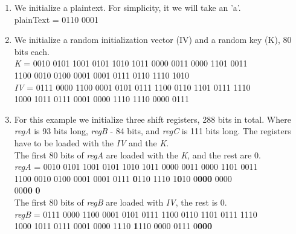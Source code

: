 \begin{enumerate}
	\setlength\itemsep{0.8em}
	\item We initialize a plaintext. For simplicity, it we will take an 'a'.\\
	{\selectfont
		plainText = 0110 0001
	}
	
	
	\item We initialize a random initialization vector (IV) and a random key (K), 80 bits each.\\
	{\selectfont
		\emph{K} = 0010 0101 1001 0101 1010 1011 0000 0011 0000 1101 0011\\
		\indent\hspace{1cm}1100 0010 0100 0001 0001 0111 0110 1110 1010
	}
	\vspace{0.5em}
	\\
	{\selectfont
		\emph{IV} = 0111 0000 1100 0001 0101 0111 1100 0110 1101 0111 1110\\ 
		\indent\hspace{1.2cm}1000 1011 0111 0001 0000 1110 1110 0000 0111
	}
	
	\item For this example we initialize three shift registers, 288 bits in total. Where \emph{regA} is 93 bits long, \emph{regB} - 84 bits, and \emph{regC} is 111 bits long. The registers have to be loaded with the \emph{IV} and the \emph{K}. \\
	The first 80 bits of \emph{regA} are loaded with the \emph{K}, and the rest are 0. 
	\vspace{0.5em}
	\\
	{\selectfont
		\emph{regA} = 0010 0101 1001 0101 1010 1011 0000 0011 0000 1101 0011 \\ 
		\indent\hspace{1.6cm}1100 0010 0100 0001 0001 0111 \textbf{0}110 1110 1\textbf{0}10 0\textbf{000}  0000\\
		\indent\hspace{1.6cm}00\textbf{00} \textbf{0}
	}
	\vspace{0.5em}
	\\
	The first 80 bits of \emph{regB} are loaded with \emph{IV}, the rest is 0. \\
	{\selectfont
		\emph{regB} = 0111 0000 1100 0001 0101 0111 1100 0110 1101 0111 1110 \\ 
		\indent\hspace{1.6cm}1000 1011 0111 0001 0000 1\textbf{1}10 \textbf{1}110 0000 0111 0\textbf{000}
	}
	

\end{enumerate}
